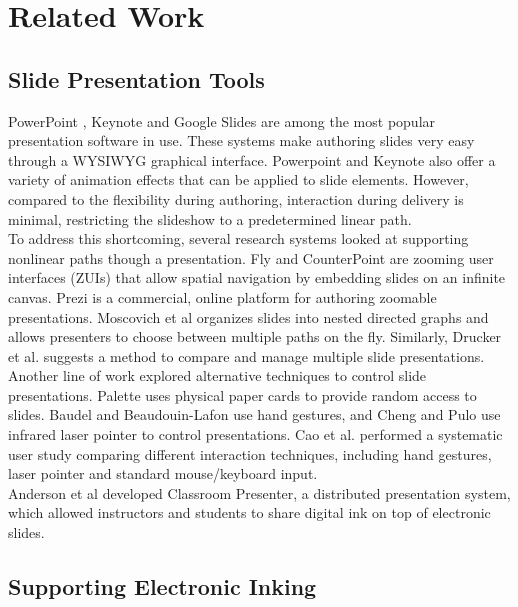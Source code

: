 \section{Related Work}
\subsection{Slide Presentation Tools}
PowerPoint \cite{powerpoint2017}, Keynote \cite{keynote2017} and Google Slides \cite{googleslides2017} are among the most popular presentation software in use. These systems make authoring slides very easy through a WYSIWYG graphical interface. Powerpoint and Keynote also offer a variety of animation effects that can be applied to slide elements. However, compared to the flexibility during authoring, interaction during delivery is minimal, restricting the slideshow to a predetermined linear path. \\
To address this shortcoming, several research systems looked at supporting nonlinear paths though a presentation. Fly \cite{lichtschlag2009fly} and CounterPoint \cite{good2002zoomable} are zooming user interfaces (ZUIs) that allow spatial navigation by embedding slides on an infinite canvas. Prezi \cite{prezi2017} is a commercial, online platform for authoring zoomable presentations. Moscovich et al \cite{moscovich2004customizable} organizes slides into nested directed graphs and allows presenters to choose between multiple paths on the fly. Similarly, Drucker et al. \cite{drucker2006comparing} suggests a method to compare and manage multiple slide presentations. \\
Another line of work explored alternative techniques to control slide presentations. Palette \cite{nelson1999palette} uses physical paper cards to provide random access to slides.  Baudel and Beaudouin-Lafon \cite{baudel1993charade} use hand gestures, and Cheng and Pulo \cite{cheng2003direct} use infrared laser pointer to control presentations. Cao et al. \cite{cao2005evaluation}
performed a systematic user study comparing different interaction techniques, including hand gestures, laser pointer and standard mouse/keyboard input. \\
Anderson et al \cite{anderson2007classroom} developed Classroom Presenter, a distributed presentation system, which allowed instructors and students to share digital ink on top of
electronic slides. 

\subsection{Supporting Electronic Inking}

